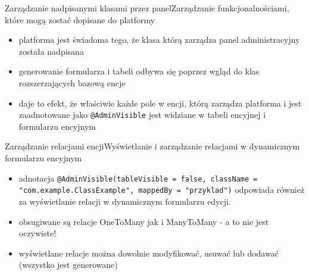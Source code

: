 \documentclass[polish,xcolor=table,9pt,aspectratio=1610,hyperref={pdfpagemode=FullScreen}]{beamer}
\begin{document}
\begin{frame}{Zarządzanie nadpisanymi klasami przez panel}{Zarządzanie funkcjonalnościami, które mogą zostać dopisane do platformy}
	\begin{itemize}
		\begin{exampleblock}{Przykład}
			Programista decyduje się na zaimplementowanie nowej funkcjonalności, która będzie polegała na tym, że każde zamówienie będzie mógło mieć uwagę. W systemie istnieje encja Order, ma już zdefiniowane pola, ma również swój formularz. Nie jest to jednak problem, gdyż w tym przypadku wystarczy zaimplementować klasę \texttt{MyOrder extends Order}, która będzie zawierała pole \texttt{private String note}.  Aplikacja korzystająca z frameworkowego panelu będzie świadoma tego, że encja order została nadpisana i będzie szukać w niej pól z aadnotacją \texttt{@AdminVisible}, które zostaną wyświetlone w dynamicznym formularzu i dynamicznej tabelce.
		\end{exampleblock}
		\item<1-> platforma jest świadoma tego, że klasa którą zarządza panel administracyjny została nadpisana 
		\item<1-> generowanie formularza i tabeli odbywa się poprzez wgląd do klas rozszerzających bazową encje
		\item<1-> daje to efekt, że właściwie każde pole w encji, którą zarządza platforma i jest zaadnotowane jako \texttt{@AdminVisible} jest widziane w tabeli encyjnej i formularzu encyjnym
	\end{itemize}
\end{frame}

\begin{frame}{Zarządzanie relacjami encji}{Wyświetlanie i zarządzanie relacjami w dynamicznym formularzu encyjnym}
\begin{itemize}
	\begin{exampleblock}{Przykład}
		Encja \texttt{Product} jest w relacji \texttt{OneToMany} z encją \texttt{Price}. Aby panel administracyjny był w pełni wartościowy, po wejściu do formularza edycyjnego powinniśmy mieć możliwość dodania ceny do produktu. W tym celu należy umieścić adnotację \texttt{@AdminVisible(tableVisible = false, className = "com.example.Price", mappedBy = "product")} nad kolekcją cen. System w panelu administracyjnym wyświetli listę cen w produkcie. 
	\end{exampleblock}
	\item<1-> adnotacja \texttt{@AdminVisible(tableVisible = false, className = "com.example.ClassExample", mappedBy = "przyklad")} odpowiada również za wyświetlanie relacji w dynamicznym formularzu edycji. 
	\item<1-> obsugiwane są relacje OneToMany jak i ManyToMany - a to nie jest oczywiste!
	\item<1-> wyświetlane relacje można dowolnie modyfikować, usuwać lub dodawać (wszystko jest generowane)
\end{itemize}
\end{frame}
\end{document}
